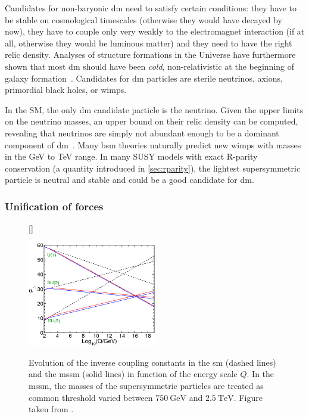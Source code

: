 Candidates for non-baryonic \gls{dm} need to satisfy certain conditions: they have to be stable on cosmological timescales (otherwise they would have decayed by now), they have to couple only very weakly to the electromagnet interaction (if at all, otherwise they would be luminous matter) and they need to have the right relic density. Analyses of structure formations in the Universe have furthermore shown that most \gls{dm} should have been \textit{cold}, \ie non-relativistic at the beginning of galaxy formation~\cite{Bertone:2004pz}. Candidates for \gls{dm} particles are \eg sterile neutrinos, axions, primordial black holes, or \glspl{wimp}.

In the SM, the only \gls{dm} candidate particle is the neutrino. Given the upper limits on the neutrino masses, an upper bound on their relic density can be computed, revealing that neutrinos are simply not abundant enough to be a dominant component of \gls{dm}~\cite{Bertone:2004pz}. Many \gls{bsm} theories naturally predict new \glspl{wimp} with masses in the GeV to TeV range. In many SUSY models with exact R-parity conservation (a quantity introduced in \cref{sec:rparity}), the lightest supersymmetric particle is neutral and stable and could be a good candidate for \gls{dm}.

\subsubsection{Unification of forces}

\begin{figure}
[\FBwidth]
{\caption{Evolution of the inverse coupling constants in the \gls{sm} (dashed lines) and the \gls{mssm} (solid lines) in function of the energy scale $Q$. In the \gls{mssm}, the masses of the supersymmetric particles are treated as common threshold varied between $\SI{750}{\GeV}$ and $\SI{2.5}{\TeV}$. Figure taken from \cite{Martin:1997ns}.}\label{fig:unification_forces}}
{\includegraphics[width=0.5\textwidth]{unification}}
\end{figure}


